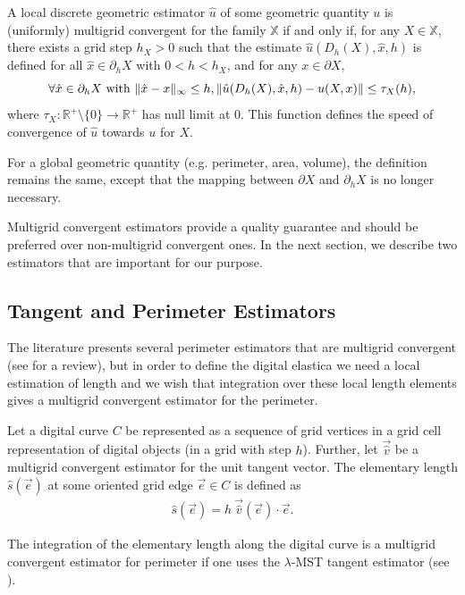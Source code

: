 \documentclass[runningheads]{llncs}
\DeclarePairedDelimiter\norm{\lVert}{\rVert}%
\begin{document}
\begin{definition}
  A local discrete geometric estimator $\hat{u}$ of some geometric
  quantity $u$ is (uniformly) multigrid convergent for the family $\mathbb{X}$ if
  and only if, for any $X \in \mathbb{X}$, there exists a grid step
  $h_X>0$ such that the estimate $\hat{u}(D_h(X),\hat{x},h)$ is
  defined for all $\hat{x} \in \partial_hX$ with $ 0 < h < h_X$, and
  for any $x \in \partial X$,
  \begin{equation*}
    \forall \hat{x} \in  \partial_hX \text{ with } \norm{ \hat{x} - x }_{\infty} \leq h, \norm{ \hat{u}(D_h(X),\hat{x},h) - u(X,x)} \leq \tau_{X}(h),			
  \end{equation*}
  where $\tau_{X}:\mathbb{R}^{+}\setminus\{0\} \rightarrow
  \mathbb{R}^{+}$ has null limit at $0$. This function defines the
  speed of convergence of $\hat{u}$ towards $u$ for $X$.
\end{definition}
	
For a global geometric quantity (e.g. perimeter, area, volume), the definition remains the same, except that the mapping
between $\partial X$ and $\partial_h X$ is no longer necessary.
	
Multigrid convergent estimators provide a quality guarantee and should
be preferred over non-multigrid convergent ones. In the next section,
we describe two estimators that are important for our purpose.

\subsection{Tangent and Perimeter Estimators}

The literature presents several perimeter estimators that are multigrid convergent (see
\cite{coeurjolly04comparative,coeurjolly12multigrid} for a review), but in order to define the digital elastica we need a local estimation
of length and we wish that integration over these local length elements gives a multigrid convergent estimator for the
perimeter.

\begin{definition}
  Let a digital curve $C$ be represented as a sequence of grid vertices in a grid cell representation of digital objects (in a grid with step $h$). Further, let $\vec{ \hat{v} }$ be a multigrid convergent estimator for the unit tangent vector. The elementary length $\hat{s}(\vec{e})$ at some oriented grid edge $ \vec{e} \in C$ is defined as
  \begin{align*}
    \hat{s}(\vec{e}) = h ~\vec{\hat{v}}(\vec{e}) \cdot \vec{e}.
  \end{align*}
\end{definition}
The integration of the elementary length along the digital curve is a multigrid convergent estimator for perimeter if
one uses the $\lambda$-MST \cite{lachaud07tangent} tangent estimator (see \cite{lachaud06hdr}).
\end{document}
